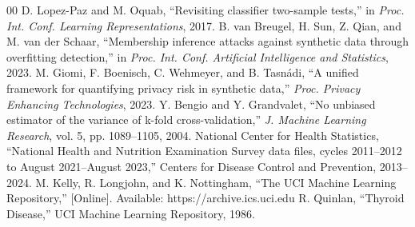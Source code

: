 \documentclass[conference]{IEEEtran}
\begin{document}
\begin{thebibliography}{00}
 D. Lopez-Paz and M. Oquab, ``Revisiting classifier two-sample tests,'' in \textit{Proc. Int. Conf. Learning Representations}, 2017.
 B. van Breugel, H. Sun, Z. Qian, and M. van der Schaar, ``Membership inference attacks against synthetic data through overfitting detection,'' in \textit{Proc. Int. Conf. Artificial Intelligence and Statistics}, 2023.
 M. Giomi, F. Boenisch, C. Wehmeyer, and B. Tasn\'adi, ``A unified framework for quantifying privacy risk in synthetic data,'' \textit{Proc. Privacy Enhancing Technologies}, 2023.
 Y. Bengio and Y. Grandvalet, ``No unbiased estimator of the variance of k-fold cross-validation,'' \textit{J. Machine Learning Research}, vol. 5, pp. 1089--1105, 2004.
 National Center for Health Statistics, ``National Health and Nutrition Examination Survey data files, cycles 2011--2012 to August 2021--August 2023,'' Centers for Disease Control and Prevention, 2013--2024.
 M. Kelly, R. Longjohn, and K. Nottingham, ``The UCI Machine Learning Repository,'' [Online]. Available: https://archive.ics.uci.edu
 R. Quinlan, ``Thyroid Disease,'' UCI Machine Learning Repository, 1986.
\end{thebibliography}
\end{document}
